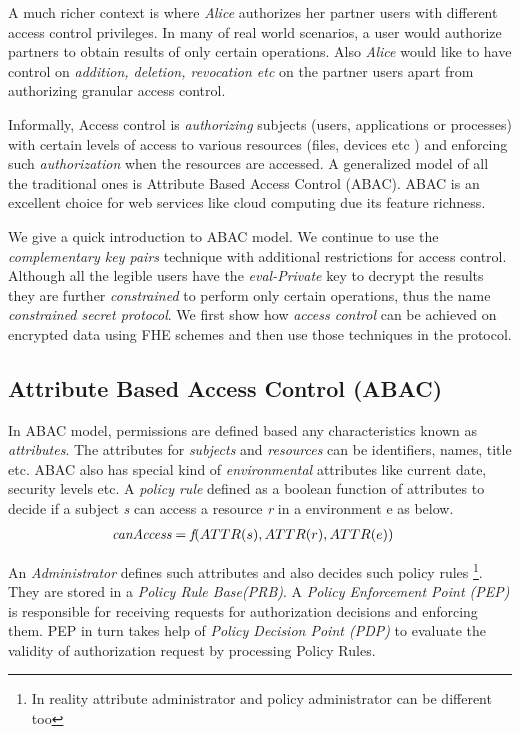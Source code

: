 \documentclass[conference]{IEEEtran}
\numberwithin{equation}{section}
\begin{document}
A much richer context is where \emph{Alice} authorizes her partner users with different access control privileges. In many of real world scenarios, a user would authorize partners to obtain results of only certain operations. Also \emph{Alice} would like to have control on \emph{addition, deletion, revocation etc } on the partner users apart from authorizing granular access control.

Informally, Access control is \emph{authorizing}  subjects (users, applications or processes) with certain levels of access to various resources (files, devices etc ) and enforcing such \emph{authorization} when the resources are accessed. A generalized model of all the traditional ones is Attribute Based Access Control (ABAC)\cite{jin2012unified}. ABAC is an excellent choice for web services like cloud computing due its feature richness\cite{yuan2005abac}.

We give a quick introduction to ABAC model. We continue to use the \emph{complementary key pairs} technique with additional restrictions for access control. Although all the legible users have the \emph{eval-Private} key to decrypt the results they are further \emph{constrained} to perform only certain operations, thus the name \emph{constrained secret protocol}. We first show how \emph{access control} can be achieved on encrypted data using FHE schemes and then use those techniques in the protocol.
\subsection{Attribute Based Access Control (ABAC)}

In ABAC model, permissions are defined based any characteristics known as \emph{attributes}. The attributes for \emph{subjects} and \emph{resources} can be identifiers, names, title etc. ABAC also has special kind of \emph{environmental} attributes like current date, security levels etc.  A \emph{policy rule} defined as a boolean function of attributes to decide if a subject \emph{s} can access a resource \emph{r} in a environment {e} as below. \\
\begin{align} \label{canaccess}
 \emph{canAccess}& = \emph{f}(ATTR(s),ATTR(r),ATTR(e)) 
\end{align}

An \emph{Administrator} defines such attributes and also decides such policy rules \footnote{In reality attribute administrator and policy administrator can be different too}. They are stored in a \emph{Policy Rule Base(PRB)}. A \emph{Policy Enforcement Point (PEP)} is responsible for receiving requests for authorization decisions and enforcing them. PEP in turn takes help of \emph{Policy Decision Point (PDP)} to evaluate the validity of authorization request by processing Policy Rules.
\end{document}
